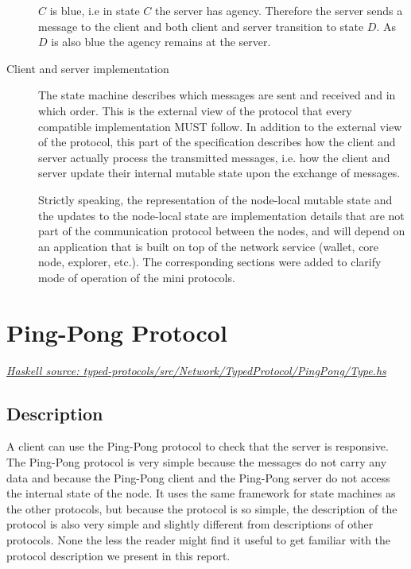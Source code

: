 \documentclass{report}
\newcommand{\hsref}[1]{\href{https://github.com/input-output-hk/ouroboros-network/blob/master/#1}{\emph{Haskell source: #1}}}
\newcommand{\msg}[1]{\texttt{#1}}
\theoremstyle{definition}{
  \newtheorem{lemma}{Lemma}[section] %
  \newtheorem{definition}[lemma]{Definition}
}
\theoremstyle{theorem}{
  \newtheorem{invariant}[lemma]{Invariant}
  \newtheorem{proofobligation}[lemma]{Proof Obligation}
}
\numberwithin{equation}{lemma}
\begin{document}
\begin{description}
      $C$ is blue, i.e in state $C$ the server has agency.
      Therefore the server sends a message to the client and
      both client and server transition to state $D$.
      As $D$ is also blue the agency remains at the server.

\item[Client and server implementation]
  The state machine describes which messages are sent and received and in which order.
  This is the external view of the protocol that every compatible implementation MUST follow.
  In addition to the external view of the protocol, this part of the specification describes
  how the client and server actually process the transmitted messages,
  i.e. how the client and server update their internal mutable state
  upon the exchange of messages.

  Strictly speaking, the representation of the node-local mutable state
  and the updates to the node-local state are implementation details that are
  not part of the communication protocol between the nodes,  and will
  depend on an application that is built on top of the network service
  (wallet, core node, explorer, etc.).
  The corresponding sections were added to clarify mode of operation of the
  mini protocols.

\end{description}

\section{Ping-Pong Protocol}
\label{ping-pong-protocol}
\hsref{typed-protocols/src/Network/TypedProtocol/PingPong/Type.hs}
\newcommand{\Ping}{\msg{Ping}}
\newcommand{\Pong}{\msg{Pong}}

\subsection{Description}
A client can use the Ping-Pong protocol to check that the server is responsive.
The Ping-Pong protocol is very simple because the messages do not carry any data and
because the Ping-Pong client and the Ping-Pong server do not access the internal state of the node.
It uses the same framework for state machines as the other protocols,
but because the protocol is so simple,
the description of the protocol is also very simple and slightly
different from descriptions of other protocols.
None the less the reader might
find it useful to get familiar with the protocol description we present in this report.
\end{document}
